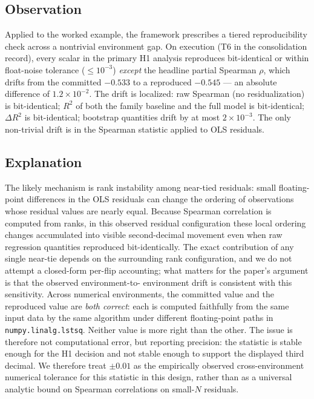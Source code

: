 \documentclass[10pt]{article}
\begin{document}
\subsection{Observation}

Applied to the worked example, the framework prescribes a tiered
reproducibility check across a nontrivial environment gap. On
execution (T6 in the consolidation record), every scalar in the
primary H1 analysis reproduces bit-identical or within float-noise
tolerance ($\leq 10^{-3}$) \emph{except} the headline partial
Spearman $\rho$, which drifts from the committed $-0.533$ to a
reproduced $-0.545$ --- an absolute difference of $1.2 \times
10^{-2}$. The drift is localized: raw Spearman (no residualization)
is bit-identical; $R^2$ of both the family baseline and the full
model is bit-identical; $\Delta R^2$ is bit-identical; bootstrap
quantities drift by at most $2 \times 10^{-3}$. The only non-trivial
drift is in the Spearman statistic applied to OLS residuals.

\subsection{Explanation}

The likely mechanism is rank instability among near-tied
residuals: small floating-point differences in the OLS residuals
can change the ordering of observations whose residual values are
nearly equal. Because Spearman correlation is computed from
ranks, in this observed residual configuration these local
ordering changes accumulated into visible second-decimal movement
even when raw regression quantities reproduced bit-identically. The exact contribution of any single
near-tie depends on the surrounding rank configuration, and we do
not attempt a closed-form per-flip accounting; what matters for
the paper's argument is that the observed environment-to-
environment drift is consistent with this sensitivity. Across
numerical environments, the committed value and the reproduced
value are \emph{both correct}: each is computed faithfully from
the same input data by the same algorithm under different
floating-point paths in \texttt{numpy.linalg.lstsq}. Neither
value is more right than the other. The issue is therefore not
computational error, but reporting precision: the statistic is
stable enough for the H1 decision and not stable enough to
support the displayed third decimal. We therefore treat $\pm 0.01$
as the empirically observed cross-environment numerical tolerance
for this statistic in this design, rather than as a universal
analytic bound on Spearman correlations on small-$N$ residuals.
\end{document}
